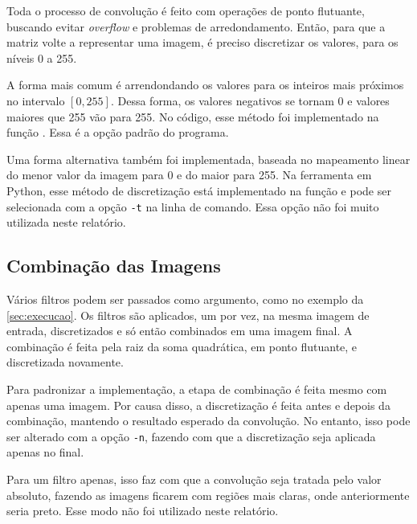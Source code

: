     Toda o processo de convolução é feito com operações de ponto flutuante, buscando evitar \textit{overflow} e problemas de arredondamento. Então, para que a matriz volte a representar uma imagem, é preciso discretizar os valores, para os níveis 0 a 255.

    A forma mais comum é arrendondando os valores para os inteiros mais próximos no intervalo $[0, 255]$. Dessa forma, os valores negativos se tornam 0 e valores maiores que 255 vão para 255. No código, esse método foi implementado na função . Essa é a opção padrão do programa.

    Uma forma alternativa também foi implementada, baseada no mapeamento linear do menor valor da imagem para 0 e do maior para 255. Na ferramenta em Python, esse método de discretização está implementado na função  e pode ser selecionada com a opção \texttt{-t} na linha de comando. Essa opção não foi muito utilizada neste relatório.

\subsection{Combinação das Imagens}

    Vários filtros podem ser passados como argumento, como no exemplo da \cref{sec:execucao}. Os filtros são aplicados, um por vez, na mesma imagem de entrada, discretizados e só então combinados em uma imagem final. A combinação é feita pela raiz da soma quadrática, em ponto flutuante, e discretizada novamente.

    Para padronizar a implementação, a etapa de combinação é feita mesmo com apenas uma imagem. Por causa disso, a discretização é feita antes e depois da combinação, mantendo o resultado esperado da convolução. No entanto, isso pode ser alterado com a opção \texttt{-n}, fazendo com que a discretização seja aplicada apenas no final.

    Para um filtro apenas, isso faz com que a convolução seja tratada pelo valor absoluto, fazendo as imagens ficarem com regiões mais claras, onde anteriormente seria preto. Esse modo não foi utilizado neste relatório.
